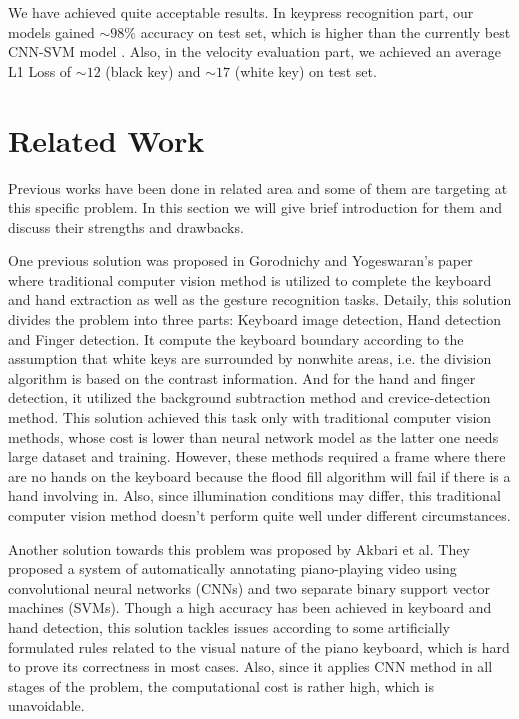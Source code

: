 \documentclass[10pt,twocolumn,letterpaper]{article}
\begin{document}
   We have achieved quite acceptable results. In keypress recognition part, our models gained \(\sim 98 \%\) accuracy on test set, which is higher than the currently best CNN-SVM model \cite{Akbari}. Also, in the velocity evaluation part, we achieved an average L1 Loss of \(\sim12\) (black key) and \(\sim17\) (white key) on test set.
   
\section{Related Work}
   Previous works have been done in related area and some of them are targeting at this specific problem. In this section we will give brief introduction for them and discuss their strengths and drawbacks.

   One previous solution was proposed in Gorodnichy and Yogeswaran's paper \cite{gorodnichy2006detection} where traditional computer vision method is utilized to complete the keyboard and hand extraction as well as the gesture recognition tasks.
   Detaily, this solution divides the problem into three parts: Keyboard image detection, Hand detection and Finger detection. 
   It compute the keyboard boundary according to the assumption that white keys are surrounded by nonwhite areas, i.e. the division algorithm is based on the contrast information.
   And for the hand and finger detection, it utilized the background subtraction method and crevice-detection method.
   This solution achieved this task only with traditional computer vision methods, whose cost is lower than neural network model as the latter one needs large dataset and training.
   However, these methods required a frame where there are no hands on the keyboard because the flood fill algorithm will fail if there is a hand involving in.
   Also, since illumination conditions may differ, this traditional computer vision method doesn't perform quite well under different circumstances.

   Another solution towards this problem was proposed by Akbari et al. \cite{Akbari} 
   They proposed a system of automatically annotating piano-playing video using convolutional neural networks (CNNs) and two separate binary support vector machines (SVMs).
   Though a high accuracy has been achieved in keyboard and hand detection, this solution tackles issues according to some artificially formulated rules related to the visual nature of the piano keyboard, which is hard to prove its correctness in most cases.
   Also, since it applies CNN method in all stages of the problem, the computational cost is rather high, which is unavoidable.
\end{document}
